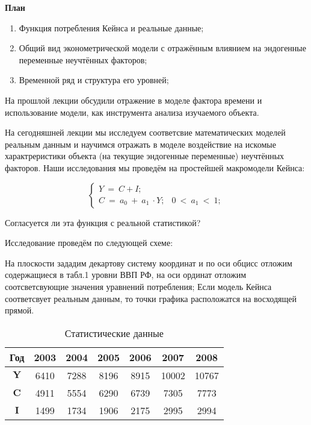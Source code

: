 \documentclass[12pt,a4paper]{article}
\author{GH-TIMe, little KoryakinAK}
\begin{document}
\begin{center}
\textbf{План}
\end{center}

\begin{enumerate}
\item Функция потребления Кейнса и реальные данные;
\item Общий вид эконометрической модели с отражённым влиянием на эндогенные переменные неучтённых факторов;
\item Временной ряд и структура его уровней;
\end{enumerate}

	На прошлой лекции обсудили отражение в моделе фактора времени и использование модели, как инструмента анализа изучаемого объекта. 

	На сегодняшней лекции мы исследуем соответсвие математических моделей реальным данным и научимся отражать в моделе воздействие на искомые характреристики объекта (на текущие эндогенные переменные) неучтённых факторов. Наши исследования мы проведём на простейшей макромодели Кейнса:

\begin{equation}
\begin{cases}
Y\ =\ C+I; & \\
C\ =\ a_{0} \ +\ a_{1} \ \cdot Y; & 0\ < \ a_{1} \ < \ 1;
\end{cases}
\end{equation}

	Согласуется ли эта функция с реальной статистикой?

	Исследование проведём по следующей схеме:

На плоскости зададим декартову систему координат и по оси обцисс отложим содержащиеся в табл.1 уровни ВВП РФ, на оси ординат отложим соотсветсвующие значения уравнений потребления; Если модель Кейнса соответсвует реальным данным, то точки графика расположатся на восходящей прямой. 


\begin{table}[!h]
\centering
\begin{tabular}{|c|c|c|c|c|c|c|}
\hline 
 \textbf{Год} & \textbf{2003} & \textbf{2004} & \textbf{2005} & \textbf{2006} & \textbf{2007} & \textbf{2008} \\
\hline 
$\displaystyle \textbf{Y}$ & 6410 & 7288 & 8196 & 8915 & 10002 & 10767 \\
\hline 
$\displaystyle \textbf{C}$ & 4911 & 5554 & 6290 & 6739 & 7305 & 7773 \\
\hline 
$\displaystyle \textbf{I}$ & 1499 & 1734 & 1906 & 2175 & 2995 & 2994 \\
 \hline
\end{tabular}
\caption{Статистические данные}
\end{table}
\end{document}
